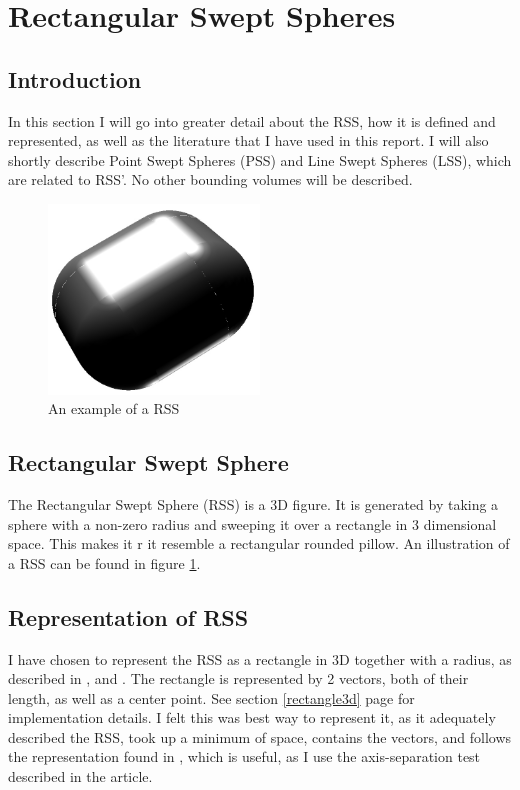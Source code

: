 
\section{Rectangular Swept Spheres}
\label{rss}

\subsection{Introduction}
In this section I will go into greater detail about the RSS, how it is defined and represented, as well as the literature that I have used in this report. I will also shortly describe Point Swept Spheres (PSS) and Line Swept Spheres (LSS), which are related to RSS'. No other bounding volumes will be described. 

\begin{figure}
\centering
\includegraphics[width=0.5\textwidth]{figures/rss}
\caption{\label{rss-example}An example of a RSS}
\end{figure}

\subsection{Rectangular Swept Sphere}
The Rectangular Swept Sphere (RSS) is a 3D figure. It is generated by taking a sphere with a non-zero radius and sweeping it over a rectangle in 3 dimensional space. This makes it r it resemble a rectangular rounded pillow. An illustration of a RSS can be found in figure \ref{rss-example}. 

\subsection{Representation of RSS}
I have chosen to represent the RSS as a rectangle in 3D together with a radius, as described in \cite{larsen00fast}, \cite{Larsen99fastproximity} and \cite{237244}. The rectangle is represented by 2 vectors, both of their length, as well as a center point. See section \ref{rectangle3d} page \pageref{rectangle3d} for  implementation details. I felt this was best way to represent it, as it adequately described the RSS, took up a minimum of space, contains the vectors, and follows the representation found in \cite{237244}, which is useful, as I use the axis-separation test described in the article.

